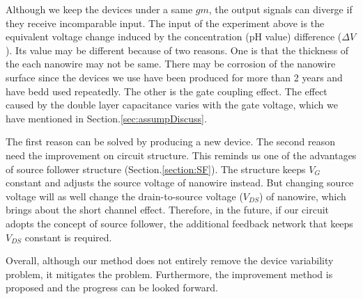 Although we keep the devices under a same $gm$, the output signals can diverge if they receive incomparable input.
The input of the experiment above is the equivalent voltage change induced by the concentration (pH value) difference ($\Delta V$).
Its value may be different because of two reasons.
One is that the thickness of the each nanowire may not be same.
There may be corrosion of the nanowire surface since the devices we use have been produced for more than 2 years and have bedd used repeatedly.
The other is the gate coupling effect.
The effect caused by the double layer capacitance varies with the gate voltage, which we have mentioned in Section.\ref{sec:assumpDiscuss}.

The first reason can be solved by producing a new device.
The second reason need the improvement on circuit structure.
This reminds us one of the advantages of source follower structure (Section.\ref{section:SF}).
The structure keeps $V_G$ constant and adjusts the source voltage of nanowire instead.
But changing source voltage will as well change the drain-to-source voltage ($V_{DS}$) of nanowire, which brings about the short channel effect.
Therefore, in the future, if our circuit adopts the concept of source follower, the additional feedback network that keeps $V_{DS}$ constant is required.

Overall, although our method does not entirely remove the device variability problem, it mitigates the problem.
Furthermore, the improvement method is proposed and the progress can be looked forward.















%

